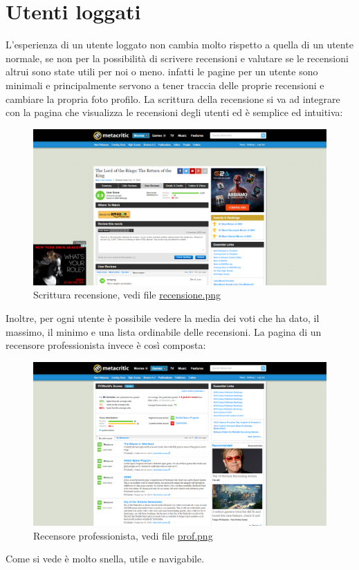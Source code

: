\documentclass[12pt]{article}
\begin{document}
\section{Utenti loggati}
L'esperienza di un utente loggato non cambia molto rispetto a quella di un utente normale, se non per la possibilità di scrivere recensioni e valutare se le recensioni altrui sono state utili per noi o meno. infatti le pagine per un utente sono minimali e principalmente servono a tener traccia delle proprie recensioni e cambiare la propria foto profilo. La scrittura della recensione si va ad integrare con la pagina che visualizza le recensioni degli utenti ed è semplice ed intuitiva:
\begin{figure}[H]
	\begin{center}
		\includegraphics[width=13.5cm]{recensione.png}
		\caption{Scrittura recensione, vedi file \href{recensione.png}{recensione.png}}
	\end{center}
\end{figure}
Inoltre, per ogni utente è possibile vedere la media dei voti che ha dato, il massimo, il minimo e una lista ordinabile delle recensioni. La pagina di un recensore professionista invece è così composta:
\begin{figure}[H]
	\begin{center}
		\includegraphics[width=13.5cm]{prof.png}
		\caption{Recensore professionista, vedi file \href{prof.png}{prof.png}}
	\end{center}
\end{figure}
Come si vede è molto snella, utile e navigabile.
\newpage
\end{document}
